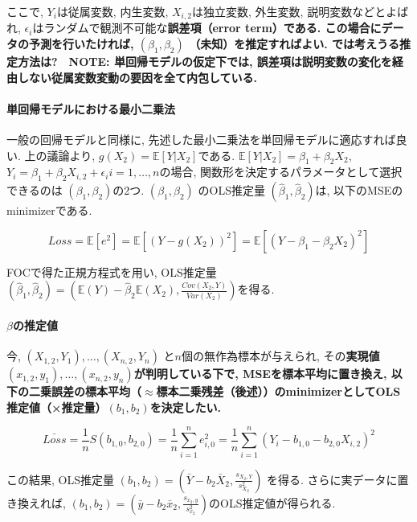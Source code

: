 \documentclass[paper=a4paper,fontsize=10pt]{jlreq}
\begin{document}
ここで, $Y_i$は従属変数, 内生変数, $X_{i,2}$は独立変数, 外生変数, 説明変数などとよばれ, $\epsilon_i$はランダムで観測不可能な\rmfamily\mcfamily\bfseries{誤差項（error term）}\mdseries である. この場合にデータの予測を行いたければ, $(\beta_1, \beta_2)$ （未知）を推定すればよい. では考えうる推定方法は?　\rmfamily\mcfamily\bfseries{NOTE}\mdseries : 単回帰モデルの仮定下では, 誤差項は説明変数の変化を経由しない従属変数変動の要因を全て内包している.\\

\paragraph{単回帰モデルにおける最小二乗法}
一般の回帰モデルと同様に, 先述した最小二乗法を単回帰モデルに適応すれば良い. 上の議論より, $g(X_2)=\mathbb{E}[Y|X_{2}]$である. $\mathbb{E}[Y|X_{2}]=\beta_1+\beta_2X_{2}$, $Y_i = \beta_1+\beta_2X_{i,2}+\epsilon_i　i=1,\dots, n$の場合, 関数形を決定するパラメータとして選択できるのは $(\beta_1, \beta_2)$の2つ. $(\beta_1, \beta_2)$ のOLS推定量 $(\hat{\beta}_1, \hat{\beta}_2)$は, 以下のMSEのminimizerである.

\begin{equation*}
  Loss=\mathbb{E}[e^{2}]=\mathbb{E}[(Y-g(X_2))^{2}]=\mathbb{E}[(Y-\beta_1-\beta_2X_{2})^{2}]
\end{equation*}

FOCで得た正規方程式を用い, OLS推定量 $(\hat{\beta}_1, \hat{\beta}_2)=(\mathbb{E}(Y)-\hat{\beta}_2\mathbb{E}(X_2), \frac{Cov(X_2,Y)}{Var(X_2)})$を得る.\\

\paragraph{$\beta$の推定値}
今, $(X_{1,2}, Y_1), \dots, (X_{n,2}, Y_n)$ と$n$個の無作為標本が与えられ, その\rmfamily\mcfamily\bfseries{実現値}\mdseries $(x_{1,2}, y_1), \dots, (x_{n,2}, y_n)$が判明している下で, MSEを\rmfamily\mcfamily\bfseries{標本平均に置き換え}\mdseries , 以下の二乗誤差の標本平均（$\approx$標本二乗残差（後述））のminimizerとしてOLS推定値（×推定量）$(b_1, b_2)$を決定したい.

\begin{equation*}
  \bar{Loss}=\frac{1}{n}S(b_{1,0}, b_{2, 0})=\frac{1}{n}\sum_{i = 1}^{n} e_{i, 0}^{2}=\frac{1}{n}\sum_{i = 1}^{n} (Y_i-b_{1, 0}-b_{2, 0}X_{i, 2})^{2}
\end{equation*}

この結果, OLS推定量 $(b_1, b_2)=(\bar{Y}-b_2\bar{X}_2, \frac{s_{X_2,Y}}{s^{2}_{X_2}})$ を得る. さらに実データに置き換えれば, $(b_1, b_2)=(\bar{y}-b_2\bar{x}_2, \frac{s_{x_2,y}}{s^{2}_{x_2}})$のOLS推定値が得られる.\\
\end{document}
